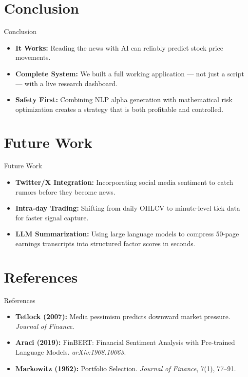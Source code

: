 \documentclass[aspectratio=169, 10pt]{beamer}
\begin{document}
\section{Conclusion}
\begin{frame}{Conclusion}
    \begin{itemize}
        \item \textbf{It Works:} Reading the news with AI can reliably predict stock price movements.
        \item \textbf{Complete System:} We built a full working application — not just a script — with a live research dashboard.
        \item \textbf{Safety First:} Combining NLP alpha generation with mathematical risk optimization creates a strategy that is both profitable and controlled.
    \end{itemize}
\end{frame}

\section{Future Work}
\begin{frame}{Future Work}
    \begin{itemize}
        \item \textbf{Twitter/X Integration:} Incorporating social media sentiment to catch rumors before they become news.
        \item \textbf{Intra-day Trading:} Shifting from daily OHLCV to minute-level tick data for faster signal capture.
        \item \textbf{LLM Summarization:} Using large language models to compress 50-page earnings transcripts into structured factor scores in seconds.
    \end{itemize}
\end{frame}

\section{References}
\begin{frame}{References}
    \begin{itemize}
        \item \textbf{Tetlock (2007):} Media pessimism predicts downward market pressure. \textit{Journal of Finance}.
        \item \textbf{Araci (2019):} FinBERT: Financial Sentiment Analysis with Pre-trained Language Models. \textit{arXiv:1908.10063}.
        \item \textbf{Markowitz (1952):} Portfolio Selection. \textit{Journal of Finance}, 7(1), 77--91.
    \end{itemize}
\end{frame}
\end{document}
